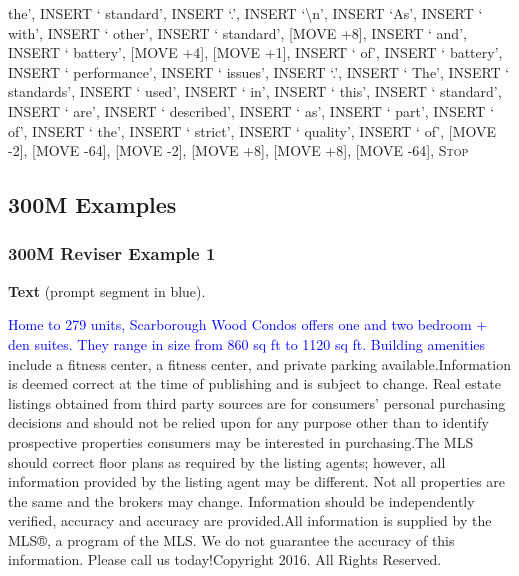 \documentclass[11pt]{article}
\DeclareRobustCommand{\Stop}{\ifmmode\text{\textsc{Stop}}\else\textsc{Stop}\fi}
\begin{document}
{the', INSERT ` standard', INSERT `.', INSERT `\textbackslash{}n', INSERT `As', INSERT ` with', INSERT ` other', INSERT ` standard', [MOVE +8], INSERT ` and', INSERT ` battery', [MOVE +4], [MOVE +1], INSERT ` of', INSERT ` battery', INSERT ` performance', INSERT ` issues', INSERT `.', INSERT ` The', INSERT ` standards', INSERT ` used', INSERT ` in', INSERT ` this', INSERT ` standard', INSERT ` are', INSERT ` described', INSERT ` as', INSERT ` part', INSERT ` of', INSERT ` the', INSERT ` strict', INSERT ` quality', INSERT ` of', [MOVE -2], [MOVE -64], [MOVE -2], [MOVE +8], [MOVE +8], [MOVE -64], \Stop\par
}
\vspace{0.8em}

\subsection{300M Examples}
\subsubsection*{300M Reviser Example 1}
\textbf{Text} (prompt segment in blue).\par
\ttfamily\small \textcolor{blue}{Home to 279 units, Scarborough Wood Condos offers one and two bedroom + den suites. They range in size from 860 sq ft to 1120 sq ft. Building amenities} include a fitness center, a fitness center, and private parking available.\newline Information is deemed correct at the time of publishing and is subject to change. Real estate listings obtained from third party sources are for consumers' personal purchasing decisions and should not be relied upon for any purpose other than to identify prospective properties consumers may be interested in purchasing.\newline The MLS should correct floor plans as required by the listing agents; however, all information provided by the listing agent may be different. Not all properties are the same and the brokers may change. Information should be independently verified, accuracy and accuracy are provided.\newline All information is supplied by the MLS®, a program of the MLS. We do not guarantee the accuracy of this information. Please call us today!\newline Copyright 2016. All Rights Reserved.
\end{document}
